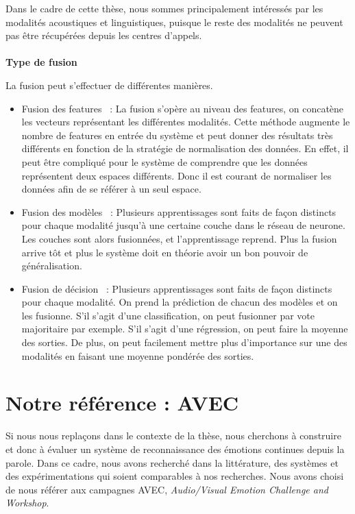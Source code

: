 Dans le cadre de cette thèse, nous sommes principalement intéressés par les modalités acoustiques et linguistiques, puisque le reste des modalités ne peuvent pas être récupérées depuis les centres d'appels.
\\
\\
\textbf{Type de fusion}

La fusion peut s'effectuer de différentes manières.
\begin{itemize}
  \item Fusion des features~\cite{Wollmer2013,Alam2014,Atrey2010} : La fusion s'opère au niveau des features, on concatène les vecteurs représentant les différentes modalités. Cette méthode augmente le nombre de features en entrée du système et peut donner des résultats très différents en fonction de la stratégie de normalisation des données. En effet, il peut être compliqué pour le système de comprendre que les données représentent deux espaces différents. Donc il est courant de normaliser les données afin de se référer à un seul espace.
  \item Fusion des modèles~\cite{Atrey2010,Liu2018} : Plusieurs apprentissages sont faits de façon distincts pour chaque modalité jusqu'à une certaine couche dans le réseau de neurone. Les couches sont alors fusionnées, et l'apprentissage reprend. Plus la fusion arrive tôt et plus le système doit en théorie avoir un bon pouvoir de généralisation.
  \item Fusion de décision~\cite{Wollmer2013,Atrey2010} : Plusieurs apprentissages sont faits de façon distincts pour chaque modalité. On prend la prédiction de chacun des modèles et on les fusionne. S'il s'agit d'une classification, on peut fusionner par vote majoritaire par exemple. S'il s'agit d'une régression, on peut faire la moyenne des sorties. De plus, on peut facilement mettre plus d'importance sur une des modalités en faisant une moyenne pondérée des sorties.
\end{itemize}

\section{Notre référence : AVEC}


Si nous nous replaçons dans le contexte de la thèse, nous cherchons à construire et donc à évaluer un système de reconnaissance des émotions continues depuis la parole. Dans ce cadre, nous avons recherché dans la littérature, des systèmes et des expérimentations qui soient comparables à nos recherches. Nous avons choisi de nous référer aux campagnes AVEC, \textit{Audio/Visual Emotion Challenge and Workshop}.

